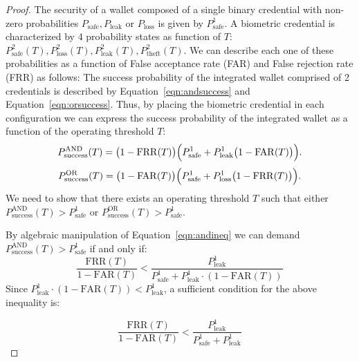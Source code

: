 \documentclass[sigconf]{acmart}
\theoremstyle{definition}
\begin{document}
\begin{proof}
    The security of a wallet composed of a single binary credential with non-zero probabilities $P_\text{safe}, P_\text{leak} \text{ or } P_\text{loss}$ is given by $P^1_\text{safe}$. A biometric credential is characterized by 4 probability states as function of $T$: $P^{2}_{\text{safe}}(T), P^{2}_{\text{loss}}(T), P^{2}_{\text{leak}}(T), P^{2}_{\text{theft}}(T)$. We can describe each one of these probabilities as a function of False acceptance rate (FAR) and False rejection rate (FRR) as follows:
    \contprobabilities
    The success probability of the integrated wallet comprised of 2 credentials is described by Equation~\ref{eqn:andsuccess} and Equation~\ref{eqn:orsuccess}. Thus, by placing the biometric credential in each configuration we can express the success probability of the integrated wallet as a function of the operating threshold $T$:
    \begin{equation}
        \label{eqn:andineq}
     P^{\text{AND}}_{\text{success}}(T) = \bigl(1-\mathrm{FRR}(T)\bigr) \Bigl( P^{1}_{\text{safe}} + P^{1}_{\text{leak}}\bigl(1-\mathrm{FAR}(T)\bigr) \Bigr). 
    \end{equation}
    \begin{equation}
        \label{eqn:orineq}
     P^{\text{OR}}_{\text{success}}(T) = \bigl(1-\mathrm{FAR}(T)\bigr) \Bigl( P^{1}_{\text{safe}} + P^{1}_{\text{loss}}\bigl(1-\mathrm{FRR}(T)\bigr) \Bigr). 
    \end{equation}
    We need to show that there exists an operating threshold $T$ such that either 
    $P^{\text{AND}}_{\text{success}}(T) > P^1_{\text{safe}}$ or $P^{\text{OR}}_{\text{success}}(T) > P^1_{\text{safe}}$.

    By algebraic manipulation of Equation~\ref{eqn:andineq} we can demand $P^{\text{AND}}_{\text{success}}(T) > P^1_{\text{safe}}$ if and only if:
    \[
    \frac{\mathrm{FRR}(T)}{1-\mathrm{FAR}(T)} < \frac{P^{1}_{\text{leak}}}{P^{1}_{\text{safe}}+P^{1}_{\text{leak}}\cdot(1-\mathrm{FAR}(T))}
    \]
    Since $P^{1}_{\text{leak}}\cdot(1-\mathrm{FAR}(T)) < P^{1}_{\text{leak}}$, a sufficient condition for the above inequality is:

    \begin{equation}
        \label{eqn:FRRineq}
    \frac{\mathrm{FRR}(T)}{1-\mathrm{FAR}(T)} < \frac{P^{1}_{\text{leak}}}{P^{1}_{\text{safe}}+P^{1}_{\text{leak}}}
    \end{equation}


\end{proof}
\end{document}
